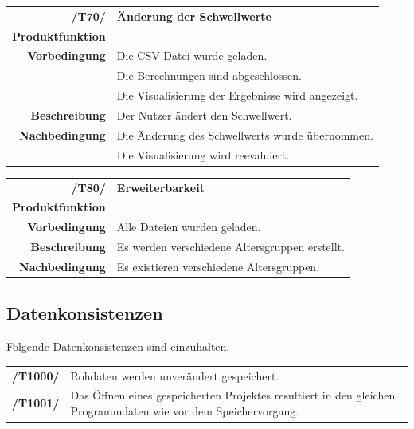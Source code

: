 \documentclass{article}
\begin{document}
\begin{table}[H]
\begin{tabularx}{\textwidth}{rX} \vspace{1mm}
\textbf{/T70/}         & \textbf{Änderung der Schwellwerte} \\ \vspace{1mm}
\textbf{Produktfunktion} & \nameref{sec:f:Schwellwerte konfigurieren} \\
\textbf{Vorbedingung}  & Die CSV-Datei wurde geladen. \\ & Die Berechnungen sind abgeschlossen. \\ \vspace{1mm} & Die Visualisierung der Ergebnisse wird angezeigt.\\ \vspace{1mm}
\textbf{Beschreibung}  & Der Nutzer ändert den Schwellwert. \\
\textbf{Nachbedingung} & Die Änderung des Schwellwerts wurde übernommen. \\ & Die Visualisierung wird reevaluiert.
\end{tabularx}
\end{table}

\begin{table}[H]
\begin{tabularx}{\textwidth}{rX} \vspace{1mm}
\textbf{/T80/}         & \textbf{Erweiterbarkeit} \\ \vspace{1mm}
\textbf{Produktfunktion} & \nameref{sec:f:Berechnung durchführen} \\
\textbf{Vorbedingung}  & Alle Dateien wurden geladen. \\
\vspace{1mm}
\textbf{Beschreibung}  & Es werden verschiedene Altersgruppen erstellt. \\
\textbf{Nachbedingung} & Es existieren verschiedene Altersgruppen.
\end{tabularx}
\end{table}

\subsection{Datenkonsistenzen}
Folgende Datenkonsistenzen sind einzuhalten.
\begin{table}[H]
\begin{tabularx}{\textwidth}{rX}
\textbf{/T1000/}        & Rohdaten werden unverändert gespeichert. \\     \textbf{/T1001/}        & Das Öffnen eines gespeicherten Projektes resultiert in den gleichen Programmdaten wie vor dem Speichervorgang. \\
\end{tabularx}
\end{table}
\end{document}
